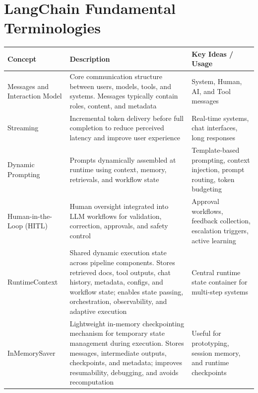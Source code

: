 \documentclass[10pt,a4paper]{article}
\begin{document}
\section{LangChain Fundamental Terminologies}
\begin{table}[H]
\centering
\small
\begin{tabular}{|p{3.5cm}|p{8cm}|p{4.8cm}|}
\hline

\textbf{Concept} &
\textbf{Description} &
\textbf{Key Ideas / Usage} \\

\hline

Messages and Interaction Model &
Core communication structure between users, models, tools, and systems. Messages typically contain roles, content, and metadata &
System, Human, AI, and Tool messages \\

\hline

Streaming &
Incremental token delivery before full completion to reduce perceived latency and improve user experience &
Real-time systems, chat interfaces, long responses \\

\hline

Dynamic Prompting &
Prompts dynamically assembled at runtime using context, memory, retrievals, and workflow state &
Template-based prompting, context injection, prompt routing, token budgeting \\

\hline

Human-in-the-Loop (HITL) &
Human oversight integrated into LLM workflows for validation, correction, approvals, and safety control &
Approval workflows, feedback collection, escalation triggers, active learning \\

\hline

RuntimeContext &
Shared dynamic execution state across pipeline components. Stores retrieved docs, tool outputs, chat history, metadata, configs, and workflow state; enables state passing, orchestration, observability, and adaptive execution &
Central runtime state container for multi-step systems \\

\hline

InMemorySaver &
Lightweight in-memory checkpointing mechanism for temporary state management during execution. Stores messages, intermediate outputs, checkpoints, and metadata; improves resumability, debugging, and avoids recomputation &
Useful for prototyping, session memory, and runtime checkpoints \\


\end{tabular}
\end{table}
\end{document}
